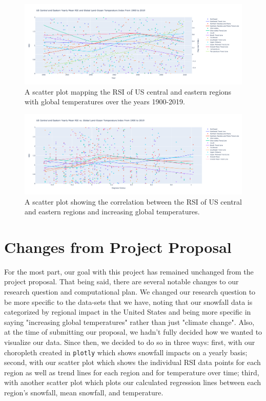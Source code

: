 \documentclass[fontsize=11pt]{article}
\begin{document}
\begin{figure}[h]
    \centering 
    \includegraphics[scale=.2]{year_comparison_scatter_plot_wide.png}
    \caption{A scatter plot mapping the RSI of US central and eastern regions with global temperatures over the years 1900-2019.}
    \label{fig:my_label}
    \end{figure}
\begin{figure}[h]
    \centering
    \includegraphics[scale=.2]{correlation_scatter_plot_wide.png}
    \caption{A scatter plot showing the correlation between the RSI of US central and eastern regions and increasing global temperatures.}
    \label{fig:my_label}
\end{figure}



\section*{Changes from Project Proposal}
For the most part, our goal with this project has remained unchanged from the project proposal. That being said, there are several notable changes to our research question and computational plan. We changed our research question to be more specific to the data-sets that we have, noting that our snowfall data is categorized by regional impact in the United States and being more specific in saying "increasing global temperatures" rather than just "climate change". Also, at the time of submitting our proposal, we hadn't fully decided how we wanted to visualize our data. Since then, we decided to do so in three ways: first, with our choropleth created in \texttt{plotly} which shows snowfall impacts on a yearly basis; second, with our scatter plot which shows the individual RSI data points for each region as well as trend lines for each region and for temperature over time; third, with another scatter plot which plots our calculated regression lines between each region's snowfall, mean snowfall, and temperature.
\end{document}

